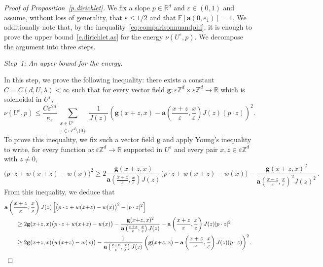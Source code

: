 \documentclass[11pt]{amsart}
\theoremstyle{plain}
\theoremstyle{definition}
\theoremstyle{remark}
\newcommand{\E}{\mathbb{E}}
\newcommand{\Zd}{\mathbb{Z}^d}
\newcommand{\Rd}{\mathbb{R}^d}
\newcommand{\R}{\mathbb{R}}
\renewcommand{\a}{\mathbf{a}}
\newcommand{\eps}{\varepsilon}
\begin{document}
	
	\begin{proof}[Proof of Proposition~\ref{p.dirichlet}]
		We fix a slope $p \in \Rd$ and $\eps \in (0 ,1)$ and assume, without loss of generality, that $\eps \leq 1/2$ and that $\E[\a(0,e_1)] = 1$. We additionally note that, by the inequality~\eqref{eq:comparisonnuandphi}, it is enough to prove the upper bound~\eqref{e.dirichlet.as} for the energy $\nu(U^\eps , p)$. We decompose the argument into three steps.
		
		\medskip
		
		\emph{Step~1: An upper bound for the energy.} 
		
		\medskip
		
		In this step, we prove the following inequality: there exists a constant $C = C(d, U, \lambda) < \infty$ such that for every vector field $\mathbf{g} : \eps\Zd \times \eps\Zd \to \R$ which is solenoidal in $U^\eps$,
		\begin{equation} \label{eq:upperboundnusolenoidal}
			\nu(U^\eps, p) \leq \frac{C \eps^{2d}}{\kappa_\eps} \sum_{\substack{x \in U^\eps \\ z \in \eps\Zd \setminus \{0\}}} \frac{1}{J(z)} \left( \mathbf{g}(x+z, x) - \a\left(\frac{x+z}{\eps}, \frac{x}{\eps}\right) J(z)(p \cdot z) \right)^2.
		\end{equation}
		To prove this inequality, we fix such a vector field $\mathbf{g}$ and apply Young's inequality to write, for every function $w : \eps\Zd \to \R$ supported in $U^\eps$ and every pair $x, z \in \eps\Zd$ with $z \neq 0$,
		\begin{equation*}
			\bigl(p \cdot z + w(x{+}z) - w(x)\bigr)^2 \geq 2 \frac{\mathbf{g}(x{+}z,x)}{\a\left(\frac{x+z}{\eps}, \frac{x}{\eps}\right) J(z)} \bigl(p \cdot z + w(x{+}z) - w(x)\bigr)
			-
			\frac{\mathbf{g}(x{+}z,x)^2}{\a\left(\frac{x+z}{\eps}, \frac{x}{\eps}\right)^2 J(z)^2}\,.
		\end{equation*}
		From this inequality, we deduce that
		\begin{align*}
			\lefteqn{\a\left(\frac{x+z}{\eps}, \frac{x}{\eps}\right) J(z) \left[ \bigl(p \cdot z + w(x{+}z) - w(x)\bigr)^2 - |p \cdot z|^2 \right]} \qquad & \\
			& \ge
			2 \mathbf{g}(x{+}z,x) \bigl(p \cdot z + w(x{+}z) - w(x)\bigr)
			-
			\frac{\mathbf{g}(x{+}z,x)^2}{\a\left(\frac{x+z}{\eps}, \frac{x}{\eps}\right) J(z)} - \a\left(\frac{x+z}{\eps}, \frac{x}{\eps}\right) J(z) |p \cdot z|^2 \\
			& \geq 2 \mathbf{g}(x{+}z,x) \bigl(w(x{+}z) - w(x)\bigr) - \frac{1}{\a\left(\frac{x+z}{\eps}, \frac{x}{\eps}\right) J(z)} \left( \mathbf{g}(x{+}z, x) - \a\left(\frac{x+z}{\eps}, \frac{x}{\eps}\right) J(z)(p \cdot z) \right)^2.

\end{align*}
\end{proof}
\end{document}
